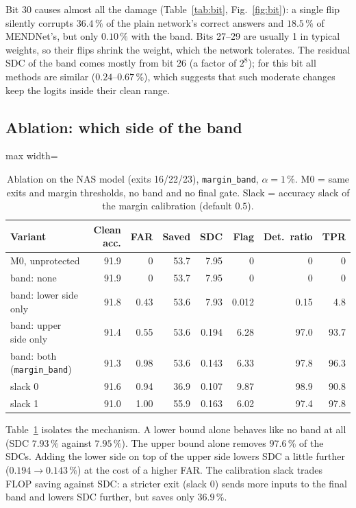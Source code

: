 \documentclass[10pt,a4paper]{article}
\newcommand{\meth}[1]{\texttt{#1}}
\newcommand{\ours}{\meth{margin\_band}}
\begin{document}
Bit 30 causes almost all the damage (Table~\ref{tab:bit}, Fig.~\ref{fig:bit}): a single flip silently
corrupts $36.4\,\%$ of the plain network's correct answers and $18.5\,\%$ of MENDNet's, but only
$0.10\,\%$ with the band. Bits 27--29 are usually 1 in typical weights, so their flips shrink the weight, which the network
tolerates. The residual SDC of the band comes mostly from bit 26 (a factor of $2^{8}$); for this bit all
methods are similar ($0.24$--$0.67\,\%$), which suggests that such moderate changes keep the logits
inside their clean range.

\subsection{Ablation: which side of the band}\label{sec:ablation}

\begin{table}[H]
\centering\small
\caption{Ablation on the NAS model (exits 16/22/23), \ours, $\alpha=1\,\%$. M0 = same exits and margin
thresholds, no band and no final gate. Slack = accuracy slack of the margin calibration (default $0.5$).}
\label{tab:ablation}
\begin{adjustbox}{max width=\linewidth}
\begin{tabular}{@{}lrrrrrrr@{}}
\toprule
Variant & Clean acc. & FAR & Saved & SDC & Flag & Det.\ ratio & TPR \\
\midrule
M0, unprotected            & 91.9 & 0    & 53.7 & 7.95  & 0      & 0     & 0    \\
band: none                 & 91.9 & 0    & 53.7 & 7.95  & 0      & 0     & 0    \\
band: lower side only      & 91.8 & 0.43 & 53.6 & 7.93  & 0.012  & 0.15  & 4.8  \\
band: upper side only      & 91.4 & 0.55 & 53.6 & 0.194 & 6.28   & 97.0  & 93.7 \\
band: both (\ours)         & 91.3 & 0.98 & 53.6 & 0.143 & 6.33   & 97.8  & 96.3 \\
\midrule
slack 0                    & 91.6 & 0.94 & 36.9 & 0.107 & 9.87   & 98.9  & 90.8 \\
slack 1                    & 91.0 & 1.00 & 55.9 & 0.163 & 6.02   & 97.4  & 97.8 \\
\bottomrule
\end{tabular}
\end{adjustbox}
\end{table}

Table~\ref{tab:ablation} isolates the mechanism. A lower bound alone behaves like no band at all
(SDC $7.93\,\%$ against $7.95\,\%$). The upper bound alone removes $97.6\,\%$ of the SDCs. Adding the lower
side on top of the upper side lowers SDC a little further ($0.194\to0.143\,\%$) at the cost of a higher FAR. The calibration slack trades FLOP saving against SDC: a stricter exit (slack 0) sends
more inputs to the final band and lowers SDC further, but saves only $36.9\,\%$.
\end{document}
